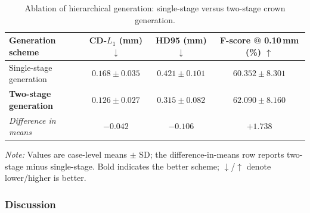 \documentclass[preprint,review,12pt]{elsarticle}
\begin{document}
\begin{table}[htbp]
    \captionsetup{position=top,justification=raggedright,singlelinecheck=false,margin=0cm,skip=6pt}
    \caption{\hspace{0.5em}Ablation of hierarchical generation: single-stage versus two-stage crown generation.}
    \label{table_hierarchical_ablation}
    \centering
    \renewcommand{\baselinestretch}{1}
    \footnotesize
    \setlength{\tabcolsep}{2.5pt}
    \renewcommand{\arraystretch}{1.15}
    \begin{tabular*}{\linewidth}{@{\extracolsep{\fill}}lccc@{}}
        \toprule
        Generation scheme &
        \makecell{CD-$L_1$\\(mm) $\downarrow$} &
        \makecell{HD95\\(mm) $\downarrow$} &
        \makecell{F-score\\@ 0.10\,mm (\%) $\uparrow$} \\
        \midrule
        Single-stage generation & $0.168 \pm 0.035$ & $0.421 \pm 0.101$ & $60.352 \pm 8.301$ \\
        \textbf{Two-stage generation} & $\bm{0.126 \pm 0.027}$ & $\bm{0.315 \pm 0.082}$ & $\bm{62.090 \pm 8.160}$ \\
        \addlinespace[2pt]
        \textit{Difference in means} & $-0.042$ & $-0.106$ & $+1.738$ \\
        \bottomrule
    \end{tabular*}
    \par\vspace{4pt}
    \begin{minipage}{\linewidth}
        \raggedright
        \textit{Note:} Values are case-level means $\pm$ SD; the difference-in-means row reports two-stage minus single-stage. Bold indicates the better scheme; $\downarrow$/$\uparrow$ denote lower/higher is better.
    \end{minipage}
\end{table}

\subsubsection{Discussion}\label{subsubsec4_4_3}
\end{document}
